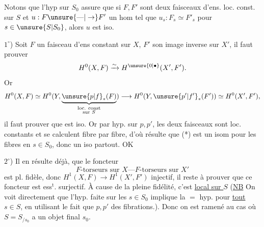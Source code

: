 
Notons que l'hyp sur $S_0$ assure que si $F,F'$ sont
deux faisceaux d'ens. loc. const. sur $S$ et $u:F\unsure{\text{---}|\to}F'$
un hom   tel que $u_s:F_s\simeq F'_s$
pour $s\in\unsure{S|S_0}$, alors $u$ est iso.

$1^\circ$) Soit $F$ un faisceau d'ens  constant sur $X$,
$F'$ son image inverse sur $X'$, il faut prouver
\[
H^0(X,F)\xrightarrow{\sim}H^{\unsure{0|\bullet}}(X',F').
\]
Or
\[
H^0(X,F)\simeq H^0(Y,\underbrace{\unsure{p|f}_*(F)}_{\substack{\text{loc. const}\\\text{sur }S}})\longrightarrow H^0(Y,\unsure{p'|f'}_*(F'))\simeq H^0(X',F'),
\]
il faut prouver que 
est iso. Or par hyp. sur $p,p'$, les deux
faisceaux sont loc. constants et se calculent
fibre par fibre, d'où résulte que (*) est un
isom pour les fibres en $s\in S_0$, donc un iso
partout. OK

$2^\circ$) Il en résulte déjà,  que le foncteur
\[
F\text{-torseurs sur }X\text{---}F\text{-torseurs sur }X'
\]
est pl. fidèle, donc $H^1(X,F)\to H^1(X',F')$
injectif, il  reste à prouver que ce foncteur
est ess$^{\mathrm t}$. surjectif. À cause de la pleine
fidélité, c'est \uline{local sur $S$} (\uline{NB} On voit directement que l'hyp. faite sur les $s\in S_0$ implique
la $=$ hyp. pour \uline{tout} $s\in S$, en utilisant le
fait que $p,p'$  des fibrations.). Donc on est ramené
au cas où $S=S_{/s_0}$ a un objet final $s_0$.


